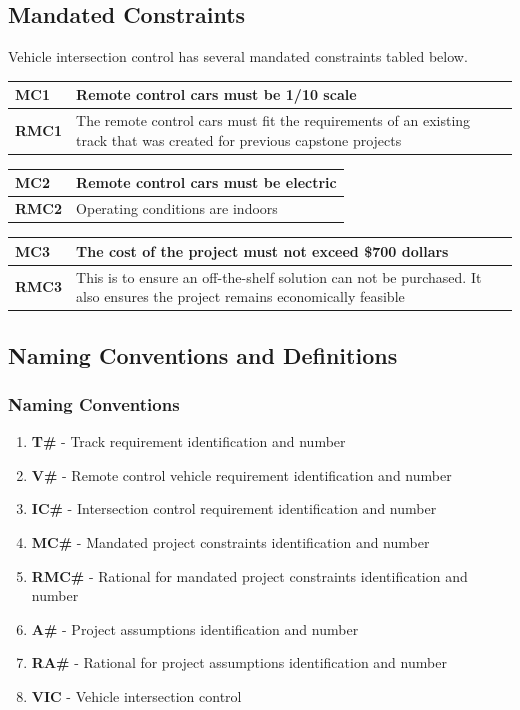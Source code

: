 \documentclass [12pt]{article}
\begin{document}
\subsection{\large Mandated Constraints}
Vehicle intersection control has several mandated constraints tabled below. 
\begin{longtable}{| p{ } | p{ } | }\hline 
\textbf{MC1} & \textbf{Remote control cars must be 1/10 scale} \\ \hline
\textbf{RMC1} & The remote control cars must fit the requirements of an existing track that was created for previous capstone projects\\ \hline
\end{longtable}
\begin{longtable}{| p{ } | p{ } | }\hline 
\textbf{MC2}& \textbf{Remote control cars must be electric}\\ \hline 
\textbf{RMC2} & Operating conditions are indoors  \\ \hline
\end{longtable}
\begin{longtable}{| p{ } | p{ } | }\hline 
\textbf{MC3} & \textbf{The cost of the project must not exceed \$700 dollars} \\ \hline
\textbf{RMC3} & This is to ensure an off-the-shelf solution can not be purchased. It also ensures the project remains economically feasible \\ \hline
\end{longtable}


\subsection{\large Naming Conventions and Definitions}
\subsubsection{Naming Conventions}
\begin{enumerate}
	\itemsep0pt 
 	\item \textbf{T\#} - Track requirement identification  and number
	\item \textbf{V\#} - Remote control vehicle requirement identification  and number				
	\item \textbf{IC\#} - Intersection control requirement identification  and number
	\item \textbf{MC\#} - Mandated project constraints identification and number 
	\item \textbf{RMC\#} - Rational for mandated project constraints identification and number
	\item \textbf{A\#} - Project assumptions identification and number
	\item \textbf{RA\#} - Rational for project assumptions identification and number
	\item \textbf{VIC} - Vehicle intersection control
\end{enumerate}
\end{document}
